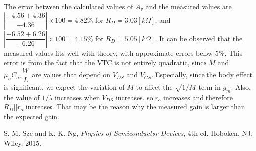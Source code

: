 \documentclass[a4paper, itemph]{oblivoir}
\theoremstyle{definition}
\begin{document}
The error between the calculated values of $A_v$ and the measured values are $\left|\dfrac{-4.56+4.36}{-4.36}\right|\times 100=4.82\%$ for $R_D=3.03[k\Omega]$, and $\left|\dfrac{-6.52+6.26}{-6.26}\right|\times 100=4.15\%$ for $R_D=5.05[k\Omega]$. It can be observed that the measured values fits well with theory, with approximate errors below $5\%$. This error is from the fact that the VTC is not entirely quadratic, since $M$ and $\mu_n C_{ox}\dfrac{W}{L}$ are values that depend on $V_{DS}$ and $V_{GS}$. Especially, since the body effect is significant, we expect the variation of $M$ to affect the $\sqrt{1/M}$ term in $g_m$. Also, the value of $1/\lambda$ increases when $V_{DS}$ increases, so $r_o$ increases and therefore $R_D||r_o$ increases. That may be the reason why the measured gain is larger than the expected gain.
\begin{thebibliography}{}

 S. M. Sze and K. K. Ng, \textit{Physics of Semiconductor Devices}, 4th ed. Hoboken, NJ: Wiley, 2015.

\end{thebibliography}
\end{document}
